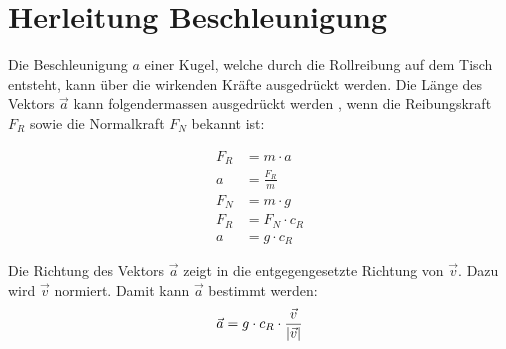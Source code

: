 \section{Herleitung Beschleunigung}\label{anhang:herleitung:beschleunigung}
Die Beschleunigung $a$ einer Kugel, welche durch die Rollreibung auf dem Tisch entsteht,
kann über die wirkenden Kräfte ausgedrückt werden.
Die Länge des Vektors $\vec{a}$ kann folgendermassen ausgedrückt werden \cite{wiki.rollreibung:1},
wenn die Reibungskraft $F_R$ sowie die Normalkraft $F_N$ bekannt ist:

\begin{align}
    F_R &= m \cdot a\\
    a &= \frac{F_R}{m}\\
    F_N &= m \cdot g\\
    F_R &= F_N \cdot c_R\\
    a &= g \cdot c_R
\end{align}

Die Richtung des Vektors $\vec{a}$ zeigt in die entgegengesetzte Richtung von $\vec{v}$.
Dazu wird $\vec{v}$ normiert. Damit kann $\vec{a}$ bestimmt werden:
\begin{align}
    \vec{a} = g \cdot c_R \cdot \frac{\vec{v}}{\lvert \vec{v} \rvert}
\end{align}
